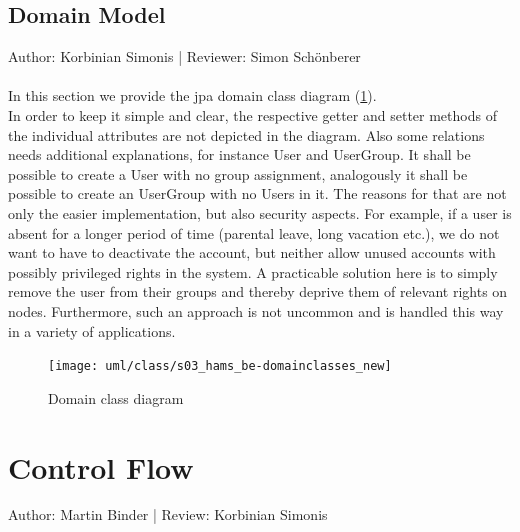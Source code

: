 \documentclass{scrreprt}
\begin{document}
\section{Domain Model}
Author: Korbinian Simonis | Reviewer: Simon Sch\"onberer \\ \\
In this section we provide the jpa domain class diagram (\ref{class_domain}). \\
In order to keep it simple and clear, the respective getter and setter methods of the individual attributes are not depicted in the diagram. Also some relations needs additional explanations, for instance User and UserGroup. It shall be possible to create a User with no group assignment, analogously it shall be possible to create an UserGroup with no Users in it. The reasons for that are not only the easier implementation, but also security aspects. For example, if a user is absent for a longer period of time (parental leave, long vacation etc.), we do not want to have to deactivate the account, but neither allow unused accounts with possibly privileged rights in the system. A practicable solution here is to simply remove the user from their groups and thereby deprive them of relevant rights on nodes.
Furthermore, such an approach is not uncommon and is handled this way in a variety of applications. 
\begin{figure}[h!]
	\centering
	\texttt{[image: uml/class/s03\_hams\_be-domainclasses\_new]}
	\caption{Domain class diagram}
	\label{class_domain}
\end{figure}
\chapter{Control Flow}
Author: Martin Binder | Review: Korbinian Simonis
\end{document}
